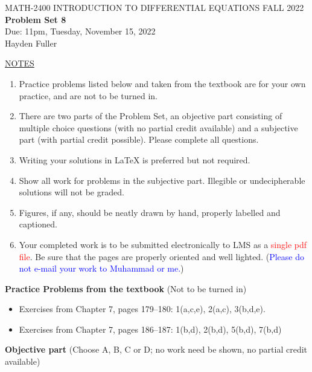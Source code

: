 \documentclass{article}
\begin{document}
\begin{center}
\large{ MATH-2400 \hspace{.27in}  INTRODUCTION TO DIFFERENTIAL EQUATIONS \hspace{.27in}FALL 2022\bigskip\\ {\bf Problem Set 8} \smallskip\\ Due: 11pm, Tuesday, November 15, 2022}
\\Hayden Fuller
\end{center}

\bigskip\noindent
\underline{NOTES}
\begin{enumerate}
\item Practice problems listed below and taken from the textbook are for your own practice, and are not to be turned in.
\item There are two parts of the Problem Set, an objective part consisting of multiple choice questions (with no partial credit available) and a subjective part (with partial credit possible).  Please complete all questions.
\item Writing your solutions in {\LaTeX} is preferred but not required.
\item Show all work for problems in the subjective part.  Illegible or undecipherable solutions will not be graded. 
\item Figures, if any, should be neatly drawn by hand, properly labelled and captioned.  
\item Your completed work is to be submitted electronically to LMS  as a \textcolor{red}{single pdf file}. Be sure that the pages are properly oriented and well lighted.  (\textcolor{blue}{Please do not e-mail your work to Muhammad or me.})
\end{enumerate}

\bigskip\noindent
{\bf Practice Problems from the textbook} (Not to be turned in)
\begin{itemize}
\item
Exercises from Chapter 7, pages 179--180: 1(a,c,e), 2(a,c), 3(b,d,e).
\item
Exercises from Chapter 7, pages 186--187: 1(b,d), 2(b,d), 5(b,d), 7(b,d)
\end{itemize}

\bigskip\noindent
{\bf Objective part} (Choose A, B, C or D; no work need be shown, no partial credit available)
\end{document}

